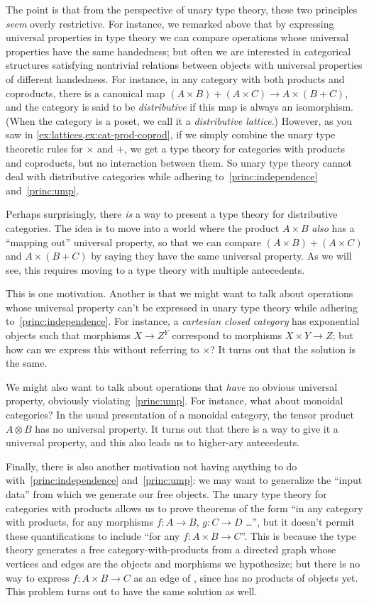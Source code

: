 \documentclass{book}
\begin{document}
The point is that from the perspective of unary type theory, these two principles \emph{seem} overly restrictive.
For instance, we remarked above that by expressing universal properties in type theory we can compare operations whose universal properties have the same handedness; but often we are interested in categorical structures satisfying nontrivial relations between objects with universal properties of different handedness.
For instance, in any category with both products and coproducts, there is a canonical map $(A\times B)+(A\times C) \to A\times (B+C)$, and the category is said to be \emph{distributive} if this map is always an isomorphism.
(When the category is a poset, we call it a \emph{distributive lattice}.)
However, as you saw in \cref{ex:lattices,ex:cat-prod-coprod}, if we simply combine the unary type theoretic rules for $\times$ and $+$, we get a type theory for categories with products and coproducts, but no interaction between them.
So unary type theory cannot deal with distributive categories while adhering to~\eqref{princ:independence} and~\eqref{princ:ump}.

Perhaps surprisingly, there \emph{is} a way to present a type theory for distributive categories.
The idea is to move into a world where the product $A\times B$ \emph{also} has a ``mapping out'' universal property, so that we can compare $(A\times B)+(A\times C)$ and $A\times (B+C)$ by saying they have the same universal property.
As we will see, this requires moving to a type theory with multiple antecedents.

This is one motivation.
Another is that we might want to talk about operations whose universal property can't be expressed in unary type theory while adhering to~\eqref{princ:independence}.
For instance, a \emph{cartesian closed category} has exponential objects such that morphisms $X\to Z^Y$ correspond to morphisms $X\times Y\to Z$; but how can we express this without referring to $\times$?
It turns out that the solution is the same.

We might also want to talk about operations that \emph{have} no obvious universal property, obviously violating~\eqref{princ:ump}.
For instance, what about monoidal categories?
In the usual presentation of a monoidal category, the tensor product $A\otimes B$ has no universal property.
It turns out that there is a way to give it a universal property, and this also leads us to higher-ary antecedents.

Finally, there is also another motivation not having anything to do with~\eqref{princ:independence} and~\eqref{princ:ump}: we may want to generalize the ``input data'' \cG from which we generate our free objects.
The unary type theory for categories with products allows us to prove theorems of the form ``in any category with products, for any morphisms $f:A\to B$, $g:C\to D$ \dots'', but it doesn't permit these quantifications to include ``for any $f:A\times B\to C$''.
This is because the type theory generates a free category-with-products from a directed graph \cG whose vertices and edges are the objects and morphisms we hypothesize; but there is no way to express $f:A\times B\to C$ as an edge of \cG, since \cG has no products of objects yet.
This problem turns out to have the same solution as well.
\end{document}
